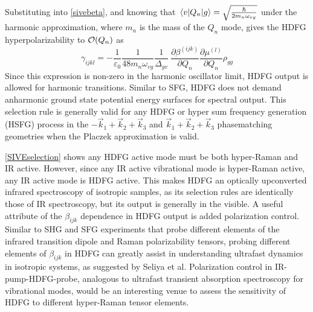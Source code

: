 \documentclass[aip, jcp, reprint, onecolumn]{revtex4-2}
\begin{document}
Substituting into \autoref{sivebeta}, and knowing that $\mel{v}{Q_n}{g} = \sqrt{\frac{\hbar}{2m_n\omega_{vg}}}$ under the harmonic approximation,\cite{RN230} where $m_n$ is the mass of the $Q_n$ mode, gives the HDFG hyperpolarizability to $\order{Q_n}$ as \begin{equation}\label{SIVEselection}
	\gamma_{ijkl} =	-\frac{1}{\varepsilon_0} \frac{1}{48 m_n \omega_{vg}}  \frac{1}{{\Delta_{gv}}} \ \frac{\partial \beta^{(ijk)}}{\partial Q_n} {\frac{\partial \mu^{(l)}}{\partial Q_n}}  \rho_{gg}
\end{equation}
Since this expression is non-zero in the harmonic oscillator limit, HDFG output is allowed for harmonic transitions. 
Similar to SFG, HDFG does not demand anharmonic ground state potential energy surfaces for spectral output. \cite{Shen94, Cho2000}
This selection rule is generally valid for any HDFG or hyper sum frequency generation (HSFG) process in the $-\vec{k}_1 + \vec{k}_2  + \vec{k}_3$ and $\vec{k}_1 + \vec{k}_2  + \vec{k}_3$ phasematching geometries when the Placzek approximation is valid.

\autoref{SIVEselection} shows any HDFG active mode must be both hyper-Raman and IR active.
However, since any IR active vibrational mode is hyper-Raman active,\cite{Cyvin1965, Andrews1978} any IR active mode is HDFG active.
This makes HDFG an optically upconverted infrared spectroscopy of isotropic samples, as its selection rules are identically those of IR spectroscopy, but its output is generally in the visible.
A useful attribute of the $\beta_{ijk}$ dependence in HDFG output is added polarization control. 
Similar to SHG and SFG experiments that probe different elements of the infrared transition dipole and Raman polarizability tensors,\cite{Heinz1982} probing different elements of $\beta_{ijk}$ in HDFG can greatly assist in understanding ultrafast dynamics in isotropic systems, as suggested by Seliya et al. \cite{Shen90, Bonn2024}
Polarization control in IR-pump-HDFG-probe, analogous to ultrafast transient absorption spectroscopy for vibrational modes, would be an interesting venue to assess the sensitivity of HDFG to different hyper-Raman tensor elements. 
\end{document}
